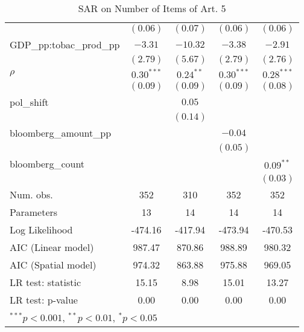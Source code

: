 \begin{table}[!h]
\begin{center}
\begin{tabular}{l c c c c }
                         & $(0.06)$     & $(0.07)$    & $(0.06)$     & $(0.06)$     \\
GDP\_pp:tobac\_prod\_pp  & $-3.31$      & $-10.32$    & $-3.38$      & $-2.91$      \\
                         & $(2.79)$     & $(5.67)$    & $(2.79)$     & $(2.76)$     \\
$\rho$                   & $0.30^{***}$ & $0.24^{**}$ & $0.30^{***}$ & $0.28^{***}$ \\
                         & $(0.09)$     & $(0.09)$    & $(0.09)$     & $(0.08)$     \\
pol\_shift               &              & $0.05$      &              &              \\
                         &              & $(0.14)$    &              &              \\
bloomberg\_amount\_pp    &              &             & $-0.04$      &              \\
                         &              &             & $(0.05)$     &              \\
bloomberg\_count         &              &             &              & $0.09^{**}$  \\
                         &              &             &              & $(0.03)$     \\
\midrule
Num. obs.                & 352          & 310         & 352          & 352          \\
Parameters               & 13           & 14          & 14           & 14           \\
Log Likelihood           & -474.16      & -417.94     & -473.94      & -470.53      \\
AIC (Linear model)       & 987.47       & 870.86      & 988.89       & 980.32       \\
AIC (Spatial model)      & 974.32       & 863.88      & 975.88       & 969.05       \\
LR test: statistic       & 15.15        & 8.98        & 15.01        & 13.27        \\
LR test: p-value         & 0.00         & 0.00        & 0.00         & 0.00         \\
\bottomrule
\multicolumn{5}{l}{\scriptsize{$^{***}p<0.001$, $^{**}p<0.01$, $^*p<0.05$}}
\end{tabular}
\caption{SAR on Number of Items of Art. 5}
\label{table:coefficients}
\end{center}
\end{table}
